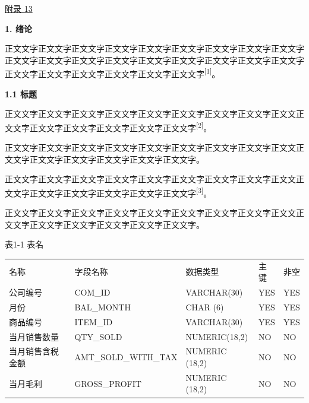 \documentclass[
]{article}
\newcounter{none} %
\begin{document}
\hyperref[_Toc32605]{附录 \hyperref[_Toc32605]{13}}

\protect{}\label{_Toc15630}{}\textbf{1. 绪论}

正文文字正文文字正文文字正文文字正文文字正文文字正文文字正文文字正文文字正文文字正文文字正文文字正文文字正文文字正文文字正文文字正文文字正文文字正文文字正文文字正文文字正文文字正文文字正文文字\textsuperscript{{[}1{]}}。

\protect{}\label{_Toc28684}{}\textbf{1.1 标题}

正文文字正文文字正文文字正文文字正文文字正文文字正文文字正文文字正文文正文文字正文文字正文文字正文文字正文文字正文文字\textsuperscript{{[}2{]}}。

正文文字正文文字正文文字正文文字正文文字正文文字正文文字正文文字正文文正文文字正文文字正文文字正文文字正文文字正文文字。

正文文字正文文字正文文字正文文字正文文字正文文字正文文字正文文字正文文正文文字正文文字正文文字正文文字正文文字正文文字\textsuperscript{{[}3{]}}。

正文文字正文文字正文文字正文文字正文文字正文文字正文文字正文文字正文文正文文字正文文字正文文字正文文字正文文字正文文字。

表1-1 表名

{\def\LTcaptype{none} %
\begin{longtable}[]{@{}
  >{\raggedright\arraybackslash}p{}
  >{\raggedright\arraybackslash}p{}
  >{\raggedright\arraybackslash}p{}
  >{\raggedright\arraybackslash}p{}
  >{\raggedright\arraybackslash}p{}@{}}
\toprule\noalign{}
\endhead
\bottomrule\noalign{}
\endlastfoot
名称 & 字段名称 & 数据类型 & 主键 & 非空 \\
公司编号 & COM\_ID & VARCHAR(30) & YES & YES \\
月份 & BAL\_MONTH & CHAR (6) & YES & YES \\
商品编号 & ITEM\_ID & VARCHAR(30) & YES & YES \\
当月销售数量 & QTY\_SOLD & NUMERIC(18,2) & NO & NO \\
当月销售含税金额 & AMT\_SOLD\_WITH\_TAX & NUMERIC (18,2) & NO & NO \\
当月毛利 & GROSS\_PROFIT & NUMERIC (18,2) & NO & NO \\
\end{longtable}
}
\end{document}
